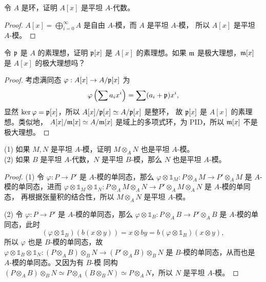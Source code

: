 \begin{problem}
  令 $A$ 是环，证明 $A[x]$ 是平坦 $A$-代数。
\end{problem}
\begin{proof}
  $A[x]=\bigoplus_{i=0}^\infty A$ 是自由 $A$-模，而 $A$ 是平坦 $A$-模，
  所以 $A[x]$ 是平坦 $A$-模。
\end{proof}

\begin{problem}
  令 $\mathfrak{p}$ 是 $A$ 的素理想，证明 $\mathfrak{p}[x]$ 是 $A[x]$ 的素理想。如果
  $\mathfrak{m}$ 是极大理想，$\mathfrak{m}[x]$ 是 $A[x]$ 的极大理想吗？
\end{problem}
\begin{proof}
  考虑满同态 $\varphi:A[x]\to A/\mathfrak{p}[x]$ 为
  \[
    \varphi\left(\sum a_ix^i\right)  =\sum (a_i+\mathfrak{p})x^i,
  \]
  显然 $\ker\varphi=\mathfrak{p}[x]$，所以 $A[x]/\mathfrak{p}[x]\simeq A/\mathfrak{p}[x]$ 是整环，
  故 $\mathfrak{p}[x]$ 是 $A[x]$ 的素理想。类似地，
  $A[x]/\mathfrak{m}[x]\simeq A/\mathfrak{m}[x]$ 是域上的多项式环，为 PID，所以 $\mathfrak{m}[x]$ 不是极大理想。
\end{proof}

\begin{problem}
  (1) 如果 $M,N$ 是平坦 $A$-模，证明 $M\otimes_AN$ 也是平坦 $A$-模。\\
  (2) 如果 $B$ 是平坦 $A$-代数，$N$ 是平坦 $B$-模，那么 $N$ 也是平坦 $A$-模。
\end{problem}
\begin{proof}
  (1) 令 $\varphi:P\to P'$ 是 $A$-模的单同态，那么 $\varphi\otimes\mathbb{1}_M:P\otimes_AM\to P'\otimes_AM$
  是 $A$-模的单同态，进而 $\varphi\otimes\mathbb{1}_M\otimes\mathbb{1}_N:P\otimes_AM\otimes_AN\to P'\otimes_AM\otimes_AN$ 是 $A$-模的单同态，
  再根据张量积的结合性，所以 $M\otimes_AN$ 是平坦 $A$-模。

  (2) 令 $\varphi:P\to P'$ 是 $A$-模的单同态，那么 $\varphi\otimes \mathbb{1}_B:P\otimes_AB\to P'\otimes_AB$
  是 $A$-模的单同态，此时
  \[
      (\varphi\otimes\mathbb{1}_B)(b(x\otimes y))=x\otimes by=b(\varphi\otimes\mathbb{1}_B)(x\otimes y),
  \]
  所以 $\varphi$ 也是 $B$-模的单同态，故 $\varphi\otimes \mathbb{1}_B\otimes \mathbb{1}_N:
  (P\otimes_AB)\otimes_BN\to (P'\otimes_AB)\otimes_BN$ 是 $B$-模的单同态，从而也是
  $A$-模的单同态。又因为有 $B$-模
  同构 $(P\otimes_AB)\otimes_BN\simeq P\otimes_A(B\otimes_BN)\simeq P\otimes_AN$，所以
  $N$ 是平坦 $A$-模。
\end{proof}

